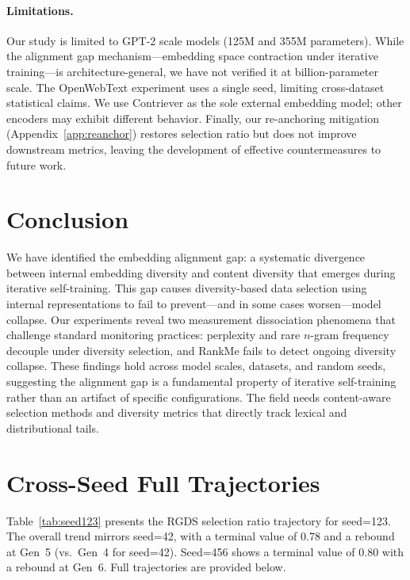 \documentclass[11pt,a4paper]{article}
\begin{document}
\paragraph{Limitations.}
Our study is limited to GPT-2 scale models (125M and 355M parameters).
While the alignment gap mechanism---embedding space contraction under iterative training---is architecture-general, we have not verified it at billion-parameter scale.
The OpenWebText experiment uses a single seed, limiting cross-dataset statistical claims.
We use Contriever as the sole external embedding model; other encoders may exhibit different behavior.
Finally, our re-anchoring mitigation (Appendix~\ref{app:reanchor}) restores selection ratio but does not improve downstream metrics, leaving the development of effective countermeasures to future work.

\section{Conclusion}

We have identified the embedding alignment gap: a systematic divergence between internal embedding diversity and content diversity that emerges during iterative self-training.
This gap causes diversity-based data selection using internal representations to fail to prevent---and in some cases worsen---model collapse.
Our experiments reveal two measurement dissociation phenomena that challenge standard monitoring practices: perplexity and rare $n$-gram frequency decouple under diversity selection, and RankMe fails to detect ongoing diversity collapse.
These findings hold across model scales, datasets, and random seeds, suggesting the alignment gap is a fundamental property of iterative self-training rather than an artifact of specific configurations.
The field needs content-aware selection methods and diversity metrics that directly track lexical and distributional tails.

\appendix

\section{Cross-Seed Full Trajectories}
\label{app:seeds}

Table~\ref{tab:seed123} presents the RGDS selection ratio trajectory for seed=123.
The overall trend mirrors seed=42, with a terminal value of 0.78 and a rebound at Gen~5 (vs.\ Gen~4 for seed=42).
Seed=456 shows a terminal value of 0.80 with a rebound at Gen~6.
Full trajectories are provided below.
\end{document}
